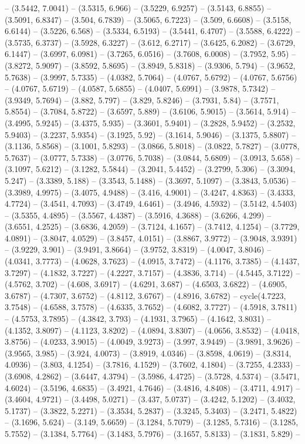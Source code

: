 -- (3.5442, 7.0041) -- (3.5315, 6.966) -- (3.5229, 6.9257) -- (3.5143, 6.8855) -- (3.5091, 6.8347) -- (3.504, 6.7839) -- (3.5065, 6.7223) -- (3.509, 6.6608) -- (3.5158, 6.6144) -- (3.5226, 6.568) -- (3.5334, 6.5193) -- (3.5441, 6.4707) -- (3.5588, 6.4222) -- (3.5735, 6.3737) -- (3.5928, 6.3227) -- (3.612, 6.2717) -- (3.6425, 6.2082) -- (3.6729, 6.1447) -- (3.6997, 6.0981) -- (3.7265, 6.0516) -- (3.7608, 6.0008) -- (3.7952, 5.95) -- (3.8272, 5.9097) -- (3.8592, 5.8695) -- (3.8949, 5.8318) -- (3.9306, 5.794) -- (3.9652, 5.7638) -- (3.9997, 5.7335) -- (4.0382, 5.7064) -- (4.0767, 5.6792) -- (4.0767, 5.6756) -- (4.0767, 5.6719) -- (4.0587, 5.6855) -- (4.0407, 5.6991) -- (3.9878, 5.7342) -- (3.9349, 5.7694) -- (3.882, 5.797) -- (3.829, 5.8246) -- (3.7931, 5.84) -- (3.7571, 5.8554) -- (3.7084, 5.8722) -- (3.6597, 5.889) -- (3.6106, 5.9015) -- (3.5614, 5.914) -- (3.4995, 5.9245) -- (3.4375, 5.935) -- (3.3601, 5.9401) -- (3.2828, 5.9452) -- (3.2532, 5.9403) -- (3.2237, 5.9354) -- (3.1925, 5.92) -- (3.1614, 5.9046) -- (3.1375, 5.8807) -- (3.1136, 5.8568) -- (3.1001, 5.8293) -- (3.0866, 5.8018) -- (3.0822, 5.7827) -- (3.0778, 5.7637) -- (3.0777, 5.7338) -- (3.0776, 5.7038) -- (3.0844, 5.6809) -- (3.0913, 5.658) -- (3.1097, 5.6212) -- (3.1282, 5.5844) -- (3.2041, 5.4452) -- (3.2799, 5.306) -- (3.3094, 5.247) -- (3.3389, 5.188) -- (3.3543, 5.1488) -- (3.3697, 5.1097) -- (3.3843, 5.0536) -- (3.3989, 4.9975) -- (3.4075, 4.9488) -- (3.416, 4.9001) -- (3.4247, 4.8363) -- (3.4333, 4.7724) -- (3.4541, 4.7093) -- (3.4749, 4.6461) -- (3.4946, 4.5932) -- (3.5142, 4.5403) -- (3.5355, 4.4895) -- (3.5567, 4.4387) -- (3.5916, 4.3688) -- (3.6266, 4.299) -- (3.6551, 4.2525) -- (3.6836, 4.2059) -- (3.7124, 4.1657) -- (3.7412, 4.1254) -- (3.7729, 4.0891) -- (3.8047, 4.0529) -- (3.8457, 4.0151) -- (3.8867, 3.9772) -- (3.9048, 3.9391) -- (3.9229, 3.901) -- (3.9491, 3.8664) -- (3.9752, 3.8319) -- (4.0047, 3.8046) -- (4.0341, 3.7773) -- (4.0628, 3.7623) -- (4.0915, 3.7472) -- (4.1176, 3.7385) -- (4.1437, 3.7297) -- (4.1832, 3.7227) -- (4.2227, 3.7157) -- (4.3836, 3.714) -- (4.5445, 3.7122) -- (4.5762, 3.702) -- (4.608, 3.6917) -- (4.6291, 3.687) -- (4.6503, 3.6822) -- (4.6905, 3.6787) -- (4.7307, 3.6752) -- (4.8112, 3.6767) -- (4.8916, 3.6782) -- cycle(4.7223, 3.7548) -- (4.6588, 3.7578) -- (4.6335, 3.7652) -- (4.6082, 3.7727) -- (4.5918, 3.7811) -- (4.5753, 3.7895) -- (4.3842, 3.793) -- (4.1931, 3.7965) -- (4.1642, 3.8031) -- (4.1352, 3.8097) -- (4.1123, 3.8202) -- (4.0894, 3.8307) -- (4.0656, 3.8532) -- (4.0418, 3.8756) -- (4.0233, 3.9015) -- (4.0049, 3.9273) -- (3.997, 3.9449) -- (3.9891, 3.9626) -- (3.9565, 3.985) -- (3.924, 4.0073) -- (3.8919, 4.0346) -- (3.8598, 4.0619) -- (3.8314, 4.0936) -- (3.803, 4.1254) -- (3.7816, 4.1529) -- (3.7602, 4.1804) -- (3.7255, 4.2333) -- (3.6908, 4.2862) -- (3.6447, 4.3794) -- (3.5986, 4.4725) -- (3.5728, 4.5374) -- (3.5471, 4.6024) -- (3.5196, 4.6835) -- (3.4921, 4.7646) -- (3.4816, 4.8408) -- (3.4711, 4.917) -- (3.4604, 4.9721) -- (3.4498, 5.0271) -- (3.437, 5.0737) -- (3.4242, 5.1202) -- (3.4032, 5.1737) -- (3.3822, 5.2271) -- (3.3534, 5.2837) -- (3.3245, 5.3403) -- (3.2471, 5.4822) -- (3.1696, 5.624) -- (3.149, 5.6659) -- (3.1284, 5.7079) -- (3.1285, 5.7316) -- (3.1285, 5.7552) -- (3.1384, 5.7764) -- (3.1483, 5.7976) -- (3.1657, 5.8133) -- (3.1831, 5.829) -- 